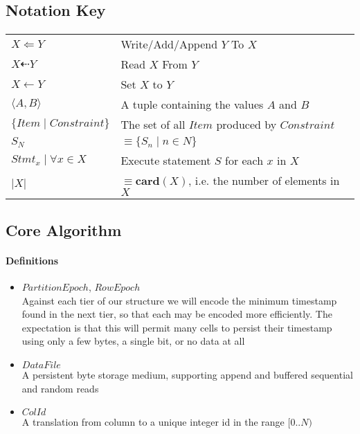 \documentclass[fleqn]{article}
\begin{document}
\subsection{Notation Key}
\paragraph{}
\begin{tabular}{l l}
$X \Leftarrow Y$ & Write/Add/Append $Y$ To $X$\\
$X \dashleftarrow Y$ & Read $X$ From $Y$\\
$X \gets Y$ & Set $X$ to $Y$\\
$\langle A,B \rangle$ & A tuple containing the values $A$ and $B$\\
$\{Item \mid Constraint\}$ & The set of all $Item$ produced by $Constraint$\\
$S_N$ & $\equiv \{S_n \mid n \in N\}$\\
$Stmt_x \mid \forall x \in X$ & Execute statement $S$ for each $x$ in $X$\\
$\lvert X \rvert$ & $\equiv \mathbf{card}(X)$, i.e. the number of elements in $X$\\
\end{tabular}

\clearpage
\subsection{Core Algorithm}
\paragraph{Definitions}
\begin{itemize}
  \item $PartitionEpoch$, $RowEpoch$\\[2pt]
    Against each tier of our structure we will encode the minimum timestamp found in the next
    tier, so that each may be encoded more efficiently. The expectation is that this will permit
    many cells to persist their timestamp using only a few bytes, a single bit, or no data at all
  \item $DataFile$\\[2pt]
    A persistent byte storage medium, supporting append and buffered sequential and random reads
  \item $ColId$\\[2pt]
    A translation from column to a unique integer id in the range $[0..N)$
\end{itemize}
\end{document}
